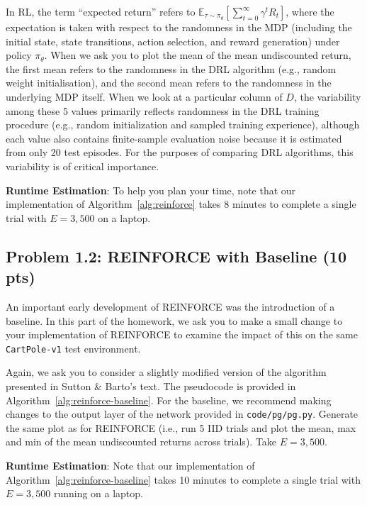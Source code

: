 \documentclass[12pt]{article}
\begin{document}
In RL, the term ``expected return'' refers to $\mathbb{E}_{\tau \sim \pi_\theta}\left[\sum_{t=0}^\infty \gamma^t R_t\right]$, where the expectation is taken with respect to the randomness in the MDP (including the initial state, state transitions, action selection, and reward generation) under policy $\pi_\theta$. When we ask you to plot the mean of the mean undiscounted return, the first mean refers to the randomness in the DRL algorithm (e.g., random weight initialisation), and the second mean refers to the randomness in the underlying MDP itself. When we look at a particular column of $D$, the variability among these 5 values primarily reflects randomness in the DRL training procedure (e.g., random initialization and sampled training experience), although each value also contains finite-sample evaluation noise because it is estimated from only 20 test episodes. For the purposes of comparing DRL algorithms, this variability is of critical importance. 

\textbf{Runtime Estimation}: To help you plan your time, note that our implementation of Algorithm~\ref{alg:reinforce} takes 8 minutes to complete a single trial with $E=3,500$ on a laptop.

\subsection*{Problem 1.2: REINFORCE with Baseline (10 pts)}
An important early development of REINFORCE was the introduction of a baseline. In this part of the homework, we ask you to make a small change to your implementation of REINFORCE to examine the impact of this on the same \texttt{CartPole-v1} test environment.

Again, we ask you to consider a slightly modified version of the algorithm presented in Sutton \& Barto's text. The pseudocode is provided in Algorithm~\ref{alg:reinforce-baseline}. For the baseline, we recommend making changes to the output layer of the network provided in \texttt{code/pg/pg.py}. Generate the same plot as for REINFORCE (i.e., run 5 IID trials and plot the mean, max and min of the mean undiscounted returns across trials). Take $E=3,500$.

\textbf{Runtime Estimation}: Note that our implementation of Algorithm~\ref{alg:reinforce-baseline} takes 10 minutes to complete a single trial with $E=3,500$ running on a laptop.
\end{document}
